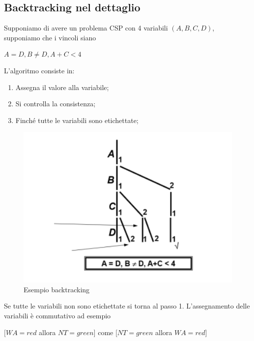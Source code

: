 \subsection{Backtracking nel dettaglio}
Supponiamo di avere un problema CSP con 4 variabili $(A,B,C,D)$, supponiamo che i
vincoli siano
\begin{center}
    $A = D, B \neq D, A + C < 4$
\end{center}
L'algoritmo consiste in:
\begin{enumerate}
    \item Assegna il valore alla variabile;
    \item Si controlla la consistenza;
    \item Finché tutte le variabili sono etichettate;
\end{enumerate}
\begin{figure}[htp]
    \centering
    \includegraphics[width=13cm, keepaspectratio]{img/Cap2/back1.png}
    \caption{Esempio backtracking}
\end{figure}
Se tutte le variabili non sono etichettate si torna al passo 1. L'assegnamento
delle variabili è commutativo ad esempio
\begin{center}
    $[WA = red$ allora $NT = green]$ come [$NT=green$ allora $WA =red]$
\end{center}


